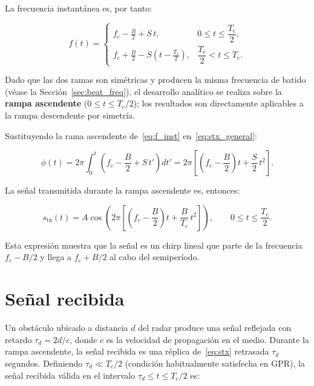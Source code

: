 \documentclass[12pt, a4paper, twoside]{report}
\begin{document}
La frecuencia instantánea es, por tanto:

\begin{equation}
  f(t) =
  \begin{cases}
    \displaystyle f_c - \frac{B}{2} + S\,t,
    & 0 \leq t \leq \dfrac{T_c}{2}, \\[10pt]
    \displaystyle f_c + \frac{B}{2} - S\!\left(t - \frac{T_c}{2}\right),
    & \dfrac{T_c}{2} < t \leq T_c.
  \end{cases}
  \label{eq:f_inst}
\end{equation}

Dado que las dos ramas son simétricas y producen la misma frecuencia
de batido (véase la Sección~\ref{sec:beat_freq}), el desarrollo
analítico se realiza sobre la \textbf{rampa ascendente}
($0 \leq t \leq T_c/2$); los resultados son directamente aplicables
a la rampa descendente por simetría.

Sustituyendo la rama ascendente de~\eqref{eq:f_inst}
en~\eqref{eq:stx_general}:

\begin{equation}
  \phi(t) = 2\pi\int_0^t \!\left(f_c - \frac{B}{2} + S\,t'\right)dt'
  = 2\pi\left[\left(f_c - \frac{B}{2}\right)t + \frac{S}{2}\,t^2\right].
\end{equation}

La señal transmitida durante la rampa ascendente es, entonces:

\begin{equation}
  \boxed{
    s_\text{tx}(t) = A\cos\!\left(
      2\pi\left[\left(f_c - \frac{B}{2}\right)t + \frac{B}{T_c}\,t^2\right]
    \right),
    \qquad 0 \leq t \leq \frac{T_c}{2}.
  }
  \label{eq:stx}
\end{equation}

Esta expresión muestra que la señal es un chirp lineal que parte
de la frecuencia $f_c - B/2$ y llega a $f_c + B/2$ al cabo del
semiperíodo.

\section{Señal recibida}
\label{sec:senal_rx}

Un obstáculo ubicado a distancia $d$ del radar produce una señal
reflejada con retardo $\tau_d = 2d/c$, donde $c$ es la velocidad de
propagación en el medio. Durante la rampa ascendente, la señal
recibida es una réplica de~\eqref{eq:stx} retrasada $\tau_d$ segundos.
Definiendo $\tau_d \ll T_c/2$ (condición habitualmente satisfecha en
GPR), la señal recibida válida en el intervalo
$\tau_d \leq t \leq T_c/2$ es:
\end{document}
